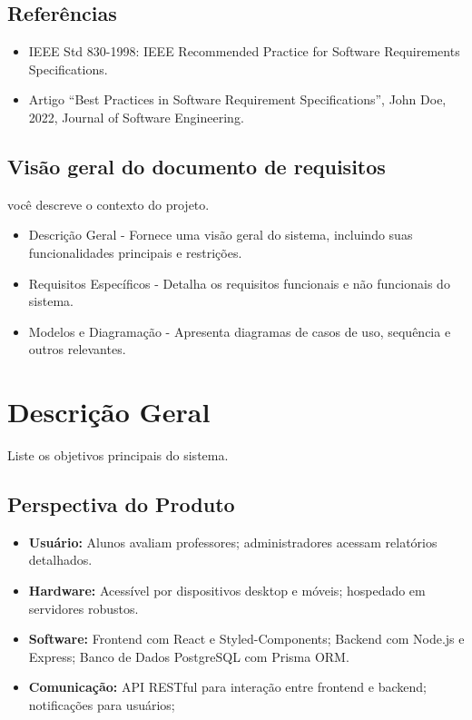 \documentclass[12pt]{article}
\begin{document}
\subsection{Referências}
\begin{itemize}
    \item IEEE Std 830-1998: IEEE Recommended Practice for Software Requirements Specifications.
    \item  Artigo “Best Practices in Software Requirement Specifications”, John
Doe, 2022, Journal of Software Engineering.
\end{itemize}

\subsection{Visão geral do documento de requisitos}
você descreve o contexto do projeto.
\begin{itemize}
    \item  Descrição Geral - Fornece uma visão geral do sistema, incluindo suas funcionalidades principais e restrições.
    \item  Requisitos Específicos - Detalha os requisitos funcionais e não funcionais do sistema.
    \item  Modelos e Diagramação - Apresenta diagramas de casos de uso, sequência e outros relevantes.
\end{itemize}


\section{Descrição Geral}
Liste os objetivos principais do sistema.
\subsection{Perspectiva do Produto}
\begin{itemize}
    \item \textbf{Usuário:} Alunos avaliam professores; administradores acessam relatórios detalhados.
    \item \textbf{Hardware:} Acessível por dispositivos desktop e móveis; hospedado em servidores robustos.
    \item \textbf{Software:} Frontend com React e Styled-Components; Backend com Node.js e Express; Banco de Dados PostgreSQL com Prisma ORM.
    \item \textbf{Comunicação:} API RESTful para interação entre frontend e backend; notificações para usuários;
\end{itemize}
\end{document}
